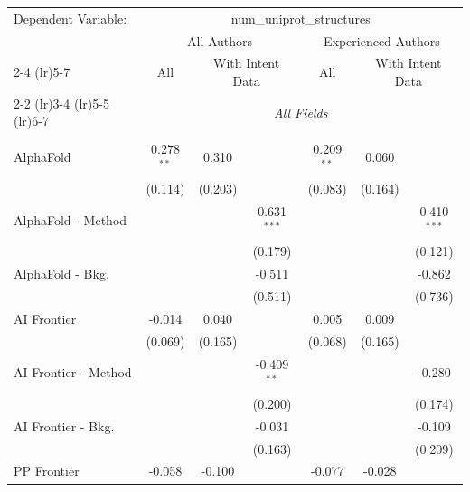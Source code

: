 \begingroup
\centering
\begin{tabular}{lcccccc}
   \tabularnewline \midrule \midrule
   Dependent Variable: & \multicolumn{6}{c}{num\_uniprot\_structures}\\
 & \multicolumn{3}{c}{All Authors} & \multicolumn{3}{c}{Experienced Authors} \\
\cmidrule(lr){2-4} \cmidrule(lr){5-7}
 & \multicolumn{1}{c}{All} & \multicolumn{2}{c}{With Intent Data} & \multicolumn{1}{c}{All} & \multicolumn{2}{c}{With Intent Data} \\
\cmidrule(lr){2-2} \cmidrule(lr){3-4} \cmidrule(lr){5-5} \cmidrule(lr){6-7}
 & \multicolumn{6}{c}{\textit{All Fields}} \\ \\
   AlphaFold            & 0.278$^{**}$ & 0.310   &               & 0.209$^{**}$ & 0.060   &   \\   
                        & (0.114)      & (0.203) &               & (0.083)      & (0.164) &   \\   
   AlphaFold - Method   &              &         & 0.631$^{***}$ &              &         & 0.410$^{***}$\\   
                        &              &         & (0.179)       &              &         & (0.121)\\   
   AlphaFold - Bkg.     &              &         & -0.511        &              &         & -0.862\\   
                        &              &         & (0.511)       &              &         & (0.736)\\   
   AI Frontier          & -0.014       & 0.040   &               & 0.005        & 0.009   &   \\   
                        & (0.069)      & (0.165) &               & (0.068)      & (0.165) &   \\   
   AI Frontier - Method &              &         & -0.409$^{**}$ &              &         & -0.280\\   
                        &              &         & (0.200)       &              &         & (0.174)\\   
   AI Frontier - Bkg.   &              &         & -0.031        &              &         & -0.109\\   
                        &              &         & (0.163)       &              &         & (0.209)\\   
   PP Frontier          & -0.058       & -0.100  &               & -0.077       & -0.028  &   \\   

\end{tabular}
